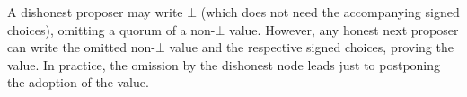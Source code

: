 A dishonest proposer may write $\bot$ (which does not need the accompanying signed choices), 
omitting a quorum of a non-$\bot$ value.   However, any honest next proposer can write the omitted 
non-$\bot$ value and the respective signed choices, proving the value.   In practice, the omission 
by the dishonest node leads just to postponing the adoption of the value.












